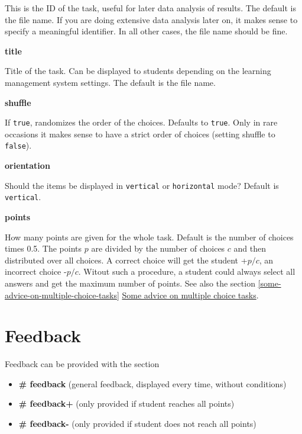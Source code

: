 \documentclass[twoside]{tufte-book}
\providecommand{\tightlist}{%
  \setlength{\itemsep}{0pt}\setlength{\parskip}{0pt}}
\begin{document}
This is the ID of the task, useful for later data analysis of results. The default is the file name. If you are doing extensive data analysis later on, it makes sense to specify a meaningful identifier. In all other cases, the file name should be fine.

\noindent\textbf{title}\label{title-1}

Title of the task. Can be displayed to students depending on the learning management system settings. The default is the file name.

\noindent\textbf{shuffle}\label{shuffle-1}

If \texttt{true}, randomizes the order of the choices. Defaults to \texttt{true}. Only in rare occasions it makes sense to have a strict order of choices (setting shuffle to \texttt{false}).

\noindent\textbf{orientation}\label{orientation-1}

Should the items be displayed in \texttt{vertical} or \texttt{horizontal} mode? Default is \texttt{vertical}.

\noindent\textbf{points}\label{points-1}

How many points are given for the whole task. Default is the number of choices times 0.5. The points \(p\) are divided by the number of choices \(c\) and then distributed over all choices. A correct choice will get the student +\(p/c\), an incorrect choice -\(p/c\). Witout such a procedure, a student could always select all answers and get the maximum number of points. See also the section \ref{some-advice-on-multiple-choice-tasks} \hyperref[some-advice-on-multiple-choice-tasks]{Some advice on multiple choice tasks}.

\section{Feedback}\label{feedback-1}

Feedback can be provided with the section

\begin{itemize}
\tightlist
\item
  \textbf{\# feedback} (general feedback, displayed every time, without conditions)
\item
  \textbf{\# feedback+} (only provided if student reaches all points)
\item
  \textbf{\# feedback-} (only provided if student does not reach all points)
\end{itemize}
\end{document}
